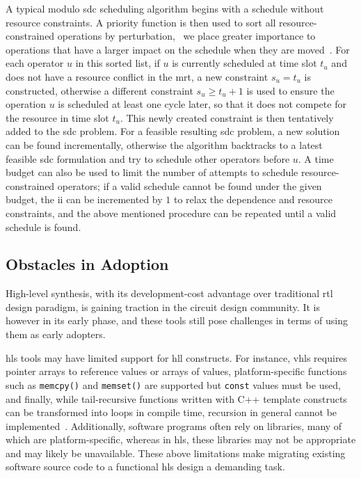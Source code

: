 A typical modulo \gls{sdc} scheduling algorithm begins with a schedule
without resource constraints.  A priority function is then used to sort
all resource-constrained operations by perturbation, \ie~we place greater
importance to operations that have a larger impact on the schedule when they
are moved~\cite{canis14}.  For each operator $u$ in this sorted list, if $u$ is
currently scheduled at time slot $t_u$ and does not have a resource conflict
in the \gls{mrt}, a new constraint $s_u = t_u$ is constructed, otherwise a
different constraint $s_u \geq t_u + 1$ is used to ensure the operation $u$
is scheduled at least one cycle later, so that it does not compete for the
resource in time slot $t_u$.  This newly created constraint is then tentatively
added to the \gls{sdc} problem.  For a feasible resulting \gls{sdc} problem,
a new solution can be found incrementally, otherwise the algorithm backtracks
to a latest feasible \gls{sdc} formulation and try to schedule other operators
before $u$.  A time budget can also be used to limit the number of attempts to
schedule resource-constrained operators; if a valid schedule cannot be found
under the given budget, the \gls{ii} can be incremented by $1$ to relax the
dependence and resource constraints, and the above mentioned procedure can be
repeated until a valid schedule is found.


\subsection{Obstacles in Adoption}
\label{bg:sub:obstacles_in_adoption}

High-level synthesis, with its development-cost advantage over traditional
\gls{rtl} design paradigm, is gaining traction in the circuit design community.
It is however in its early phase, and these tools still pose challenges in
terms of using them as early adopters.

\Gls{hls} tools may have limited support for \gls{hll} constructs.  For
instance, \gls{vhls} requires pointer arrays to reference values or arrays of
values, platform-specific functions such as \verb|memcpy()| and \verb|memset()|
are supported but \verb|const| values must be used, and finally, while
tail-recursive functions written with C++ template constructs can be
transformed into loops in compile time, recursion in general cannot be
implemented~\cite{vivado_hls}.  Additionally, software programs often rely
on libraries, many of which are platform-specific, whereas in \gls{hls}\@,
these libraries may not be appropriate and may likely be unavailable.  These
above limitations make migrating existing software source code to a functional
\gls{hls} design a demanding task.

